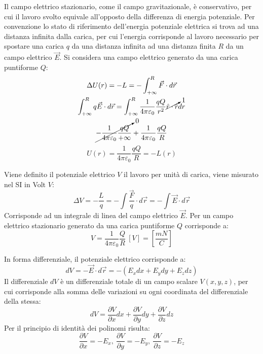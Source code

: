 \documentclass{article}
\numberwithin{equation}{subsection}
\begin{document}
Il campo elettrico stazionario, come il campo gravitazionale, è conservativo, per cui il lavoro svolto equivale all'opposto della differenza di energia potenziale. Per 
convenzione lo stato di riferimento dell'energia potenziale elettrica si trova ad una distanza infinita dalla carica, per cui l'energia corrisponde al lavoro necessario per 
spostare una carica $q$ da una distanza infinita ad una distanza finita $R$ da un campo elettrico $\vec{E}$. Si considera una campo elettrico generato da una carica puntiforme 
$Q$:
\begin{gather*}
    \Delta U(r)=-L=-\displaystyle\int_{+\infty}^R\vec{F}\cdot d\vec{r}\\
    \displaystyle\int_{+\infty}^Rq\vec{E}\cdot d\vec{r}=\int_{+\infty}^R\frac{1}{4\pi\varepsilon_0}\frac{qQ}{r^2}\cancelto{1}{\hat{r}\cdot \hat{r}}dr\\
    \cancelto{0}{-\displaystyle\frac{1}{4\pi\varepsilon_0}\frac{qQ}{+\infty}}+\frac{1}{4\pi\varepsilon_0}\frac{qQ}{R}
\end{gather*}
\begin{equation}
    U(r)=\frac{1}{4\pi\varepsilon_0}\frac{qQ}{R}=-L(r)
\end{equation}


Viene definito il potenziale elettrico $V$ il lavoro per unità di carica, viene misurato nel SI in Volt $V$:
\begin{equation}
    \Delta V=\displaystyle-\frac{L}{q}=-\int\frac{\vec{F}}{q}\cdot d\vec{r}=-\int\vec{E}\cdot d\vec{r}
\end{equation}
Corrisponde ad un integrale di linea del campo elettrico $\vec{E}$. 
Per un campo elettrico stazionario generato da una carica puntiforme $Q$ corrisponde a:
\begin{equation}
    V=\displaystyle\frac{1}{4\pi\varepsilon_0}\frac{Q}{R}\:\left[V\right]=\left[\frac{mN}{C}\right]
\end{equation}

In forma differenziale, il potenziale elettrico corrisponde a:
\begin{equation*}
    dV=-\vec{E}\cdot d\vec{r}=-(E_xdx+E_ydy+E_zdz)
\end{equation*}
Il differenziale $dV$ è un differenziale totale di un campo scalare $V(x,y,z)$, per cui corrisponde alla somma delle variazioni su ogni coordinata del differenziale della stessa: 
\begin{equation*}
    dV=\displaystyle\frac{\partial V}{\partial x}dx+\frac{\partial V}{\partial y}dy+\frac{\partial V}{\partial z}dz
\end{equation*}
Per il principio di identità dei polinomi risulta:
\begin{equation*}
    \displaystyle\frac{\partial V}{\partial x}=-E_x,\:\frac{\partial V}{\partial y}=-E_y,\:\frac{\partial V}{\partial z}=-E_z
\end{equation*}
\end{document}
